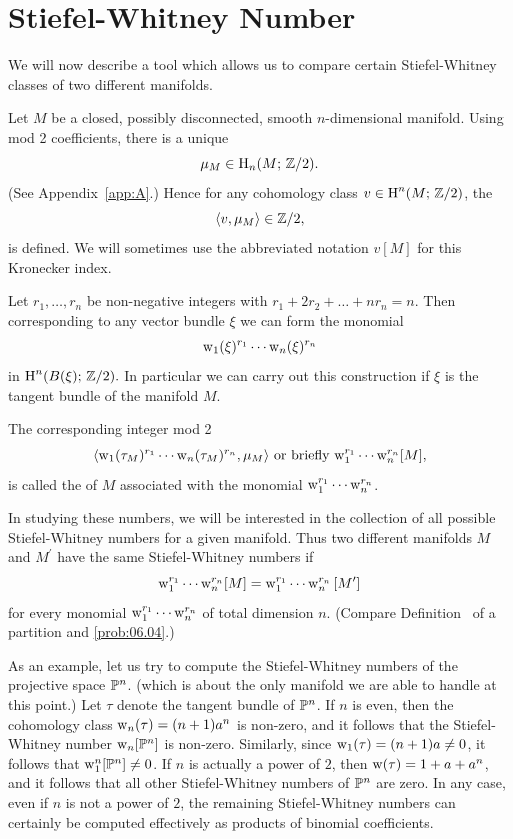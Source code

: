 \documentclass[../main]{subfiles}
\begin{document}
\section{Stiefel-Whitney Number}\label{sec:4.4}

We will now describe a tool which allows us to compare certain Stiefel-Whitney classes of two different manifolds.

Let $M$ be a closed, possibly disconnected, smooth $n$-dimensional manifold. Using mod 2 coefficients, there is a unique 
\[
\mu_{M} \in \operatorname{H}_{n}(M ; \, \mathbb{Z} / 2).
\]
(See Appendix~\ref{app:A}.) Hence for any cohomology class $v \in \operatorname{H}^{n}(M ; \, \mathbb{Z} / 2)$, the 
\[
\langle v,\mu_{M}\rangle \in \mathbb{Z} / 2,
\]
is defined. We will sometimes use the abbreviated notation $v[M]$ for this Kronecker index.

Let $r_{1}, \dots, r_{n}$ be non-negative integers with $r_{1}+2 r_{2}+\dots+n r_{n}=n$. Then corresponding to any vector bundle $\xi$ we can form the monomial
\[
\operatorname{w}_{1}(\xi)^{r_{1}} \cdots \operatorname{w}_{n}(\xi)^{r_{n}}
\]
in $\operatorname{H}^{n}(B(\xi) ;\, \mathbb{Z} / 2) .$ In particular we can carry out this construction if $\xi$ is the tangent bundle of the manifold $M$.

\begin{definition}
\label{def:04.02}
The corresponding integer mod 2
\[
\langle\operatorname{w}_{1}(\tau_{M})^{r_1} \cdots \operatorname{w}_{n}(\tau_{M})^{r_n}, \mu_{M}\rangle
\text{ or briefly }
{\operatorname{w}}_{1}^{r_1} \cdots \operatorname{w}_{n}^{r_n}[M],
\]
is called the  of $M$ associated with the monomial $\operatorname{w}_{1}^{r_{1}} \cdots \operatorname{w}_{n}^{r_n}$.
\end{definition}

In studying these numbers, we will be interested in the collection of all possible Stiefel-Whitney numbers for a given manifold. Thus two different manifolds $M$ and $M^{\prime}$ have the same Stiefel-Whitney numbers if 
\[
\operatorname{w}_{1}^{r_{1}} \cdots \operatorname{w}_{n}^{r_{n}} [M]=\operatorname{w}_{1}^{r_{1}} \cdots \operatorname{w}_{n} ^{r_n}{[M^{\prime}]}
\]
for every monomial ${\operatorname{w}}_{1}^{r_{1}} \cdots \operatorname{w}_{n}^{r_n}$ of total dimension $n$. (Compare Definition~\pageref{def:06.06} of a partition and \ref{prob:06.04}.)

As an example, let us try to compute the Stiefel-Whitney numbers of the projective space $\mathbb{P}^{n}$. (which is about the only manifold we are able to handle at this point.) Let $\tau$ denote the tangent bundle of $\mathbb{P}^{n}$. If $n$ is even, then the cohomology class $\operatorname{w}_{n}(\tau)=(n+1) a^{n}$ is non-zero, and it follows that the Stiefel-Whitney number $\operatorname{w}_{n}[\mathbb{P}^{n}]$ is non-zero. Similarly, since $\operatorname{w}_{1}(\tau)=(n+1) a \neq 0$, it follows that $\operatorname{w}_{1}^{n}[\mathbb{P}^{n}] \neq 0$. If $n$ is actually a power of $2$, then $\operatorname{w}(\tau)=1+a+a^{n}$, and it follows that all other Stiefel-Whitney numbers of $\mathbb{P}^{n}$ are zero. In any case, even if $n$ is not a power of $2$, the remaining Stiefel-Whitney numbers can certainly be computed effectively as products of binomial coefficients.
\end{document}
